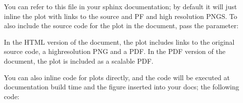 \documentclass[letterpaper,10pt,english]{sphinxmanual}
\begin{document}
\begin{sphinxVerbatim}[commandchars=\\\{\}]
  
   
\end{sphinxVerbatim}

\sphinxAtStartPar
You can refer to this file in your sphinx documentation; by default it
will just inline the plot with links to the source and PF and high
resolution PNGS.  To also include the source code for the plot in the
document, pass the  parameter:

\begin{sphinxVerbatim}[commandchars=\\\{\}]
  
\end{sphinxVerbatim}

\sphinxAtStartPar
In the HTML version of the document, the plot includes links to the
original source code, a high\sphinxhyphen{}resolution PNG and a PDF.  In the PDF
version of the document, the plot is included as a scalable PDF.

\sphinxAtStartPar
You can also inline code for plots directly, and the code will be
executed at documentation build time and the figure inserted into your
docs; the following code:

\begin{sphinxVerbatim}[commandchars=\\\{\}]
 

     
     
    
\end{sphinxVerbatim}
\end{document}
